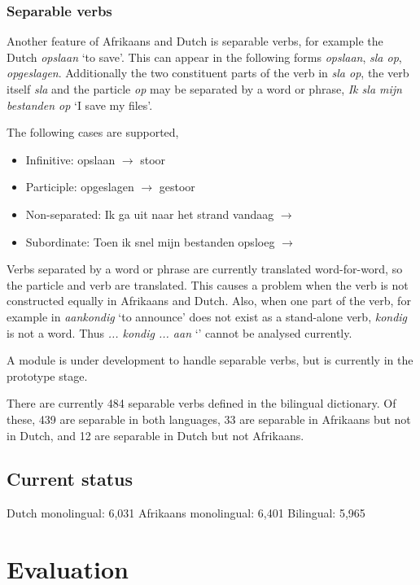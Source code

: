 \documentclass[11pt]{article}
\begin{document}
\subsubsection{Separable verbs}

Another feature of Afrikaans and Dutch is separable verbs, for example
the Dutch {\em opslaan} `to save'. This can appear in the following
forms {\em opslaan}, {\em sla op}, {\em opgeslagen}. Additionally the two constituent
parts of the verb in {\em sla op}, the verb itself {\em sla} and the particle
{\em op} may be separated by a word or phrase, {\em Ik sla mijn bestanden op}
 `I save my files'.

The following cases are supported,

\begin{itemize}
\item Infinitive: opslaan $\rightarrow$ stoor 
\item Participle: opgeslagen $\rightarrow$ gestoor
\item Non-separated: Ik ga uit naar het strand vandaag $\rightarrow$
\item Subordinate: Toen ik snel mijn bestanden opsloeg $\rightarrow$ 
\end{itemize}

Verbs separated by a word or phrase are currently translated word-for-word,
so the particle and verb are translated. This causes a problem when the
verb is not constructed equally in Afrikaans and Dutch. Also, when one part
of the verb, for example in {\em aankondig} `to announce' does not exist as
a stand-alone verb, {\em kondig} is not a word. Thus {\em ... kondig ... aan} `'
cannot be analysed currently.

A module is under development to handle separable verbs, but is currently
in the prototype stage.

There are currently 484 separable verbs defined in the bilingual
dictionary. Of these, 439 are separable in both languages, 33 are
separable in Afrikaans but not in Dutch, and 12 are separable in
Dutch but not Afrikaans.

\subsection{Current status}

Dutch monolingual: 6,031
Afrikaans monolingual: 6,401
Bilingual: 5,965

\section{Evaluation}
\end{document}
